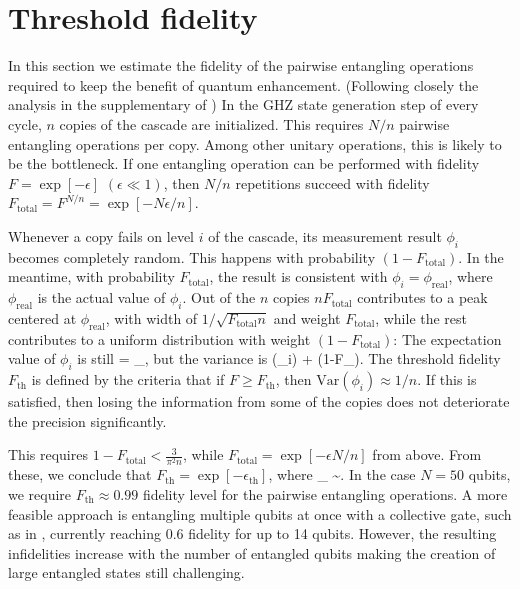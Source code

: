 \section{Threshold fidelity} 
\label{app:Threshold_fidelity}
In this section we estimate the fidelity of the pairwise entangling operations
required to keep the benefit of quantum enhancement. (Following closely the
analysis in the supplementary of \cite{Komar2014}) In the GHZ state generation step of
every cycle, $n$ copies of the cascade are initialized. 
This requires $N/n$ pairwise entangling operations per copy.
Among other unitary operations, this is likely to be the bottleneck. If one
 entangling operation can be
performed with fidelity $F = \exp[-\epsilon]$ $(\epsilon \ll 1)$, then $N/n$
repetitions succeed with fidelity $F_\mathrm{total} = F^{N/n}= \exp[-N\epsilon/n
]$.

Whenever a copy fails on level $i$ of the cascade, its measurement result
$\phi_i$ becomes completely random. This happens with probability
$(1-F_\mathrm{total})$.
In the meantime, with probability $F_\mathrm{total}$, the result is consistent with
$\phi_i = \phi_\mathrm{real}$, where $\phi_\mathrm{real}$ is the actual value of
$\phi_i $. Out of the $n$ copies $nF_\mathrm{total}$ contributes to a peak
centered at $\phi_\mathrm{real}$, with width of $1/\sqrt{F_\mathrm{total}n}$ and
weight $F_\mathrm{total}$, while the rest contributes to a uniform distribution
with weight $(1-F_\mathrm{total})$:
The expectation value of $\phi_i$ is still
\bel
 	 = \phi_,
\eel
but the variance is
 \bel
 	(\phi_i) \approx {} +
 	(1-F_).
 \eel 
The threshold fidelity $F_\mathrm{th}$ is defined by the criteria that if $F \geq
F_\mathrm{th}$, then $\mathrm{Var}(\phi_i) \approx 1/n$. If this is satisfied, then
losing the information from some of the copies does not deteriorate
 the precision significantly.

This requires $1-F_\mathrm{total} < \frac{3}{\pi^2 n}$, while
$F_\mathrm{total}= \exp[-\epsilon N/n]$ from above. From these, we conclude that
$F_\mathrm{th} = \exp[-\epsilon_\mathrm{th}]$, where
\bel
	\epsilon_ \approx {} \sim {}.
\eel
In the case $N=50$ qubits, we require
 $F_\mathrm{th} \approx 0.99$ fidelity level for the pairwise entangling
 operations. A more feasible approach is entangling multiple
 qubits at once with a collective gate, such as in \cite{Monz2011},
 currently reaching 0.6 fidelity for up to 14 qubits. However, the resulting
 infidelities  increase with the number of entangled qubits making the
 creation of large entangled states still challenging.
 